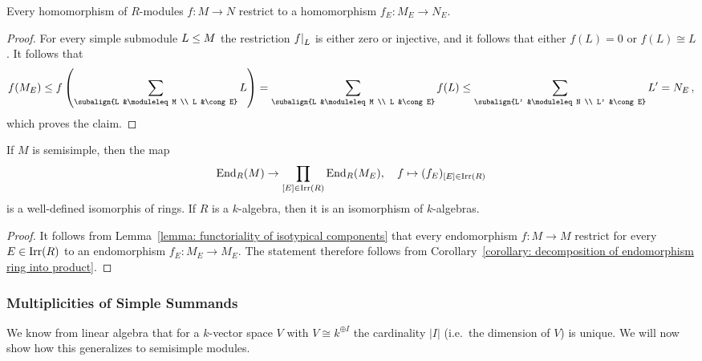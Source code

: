 \begin{lemma}
  \label{lemma: functoriality of isotypical components}
  Every homomorphism of $R$-modules $f \colon M \to N$ restrict to a homomorphism $f_E \colon M_E \to N_E$.
\end{lemma}


\begin{proof}
  For every simple submodule $L \leq M$ the restriction $\restrict{f}{L}$ is either zero or injective, and it follows that either $f(L) = 0$ or $f(L) \cong L$.
  It follows that
  \[
                f(M_E)
    \moduleleq  f
                \left(
                  \sum_{\subalign{L &\moduleleq M \\ L &\cong E}} L
                \right)
    =           \sum_{\subalign{L &\moduleleq M \\ L &\cong E}} f(L)
    \moduleleq  \sum_{\subalign{L' &\moduleleq N \\ L' &\cong E}} L'
    =           N_E \,,
  \]
  which proves the claim.
\end{proof}




\begin{corollary}
  \label{corollary: endomorphism ring of semisimple module}
  If $M$ is semisimple, then the map
  \[
            \operatorname{End}_R(M)
    \to     \prod_{[E] \in \operatorname{Irr}(R)} \operatorname{End}_R(M_E),
    \quad   f
    \mapsto (f_E)_{[E] \in \operatorname{Irr}(R)}
  \]
  is a well-defined isomorphis of rings.
  If $R$ is a $k$-algebra, then it is an isomorphism of $k$-algebras.
\end{corollary}


\begin{proof}
  It follows from Lemma~\ref{lemma: functoriality of isotypical components} that every endomorphism $f \colon M \to M$ restrict for every $E \in \operatorname{Irr}(R)$ to an endomorphism $f_E \colon M_E \to M_E$.
  The statement therefore follows from Corollary~\ref{corollary: decomposition of endomorphism ring into product}.
\end{proof}





\subsubsection{Multiplicities of Simple Summands}


\begin{fluff}
  We know from linear algebra that for a $k$-vector space $V$ with $V \cong k^{\oplus I}$ the cardinality $|I|$ (i.e.\ the dimension of $V$) is unique.
  We will now show how this generalizes to semisimple modules.
\end{fluff}



